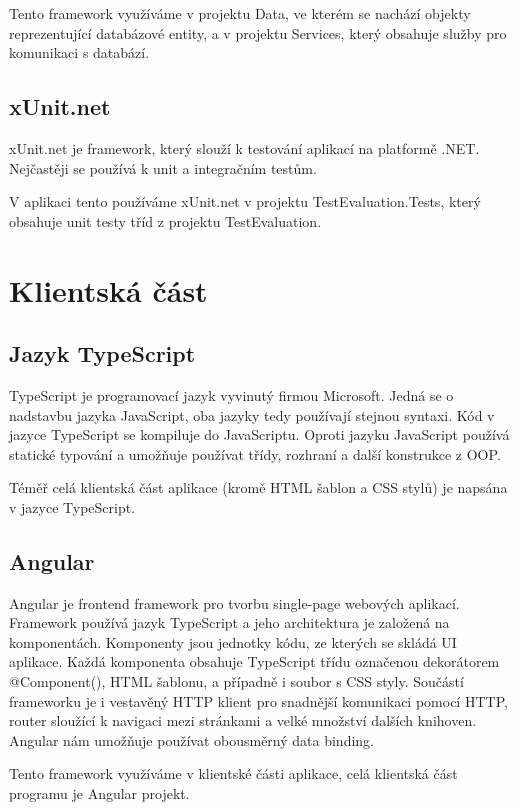 Tento framework využíváme v projektu Data, ve kterém se nachází objekty reprezentující databázové entity, a v projektu Services, který obsahuje služby pro komunikaci s databází.

\subsection{xUnit.net}
xUnit.net je framework, který slouží k testování aplikací na platformě .NET. Nejčastěji se používá k unit a integračním testům. 
\cite{xUnitDocs}

V aplikaci tento používáme xUnit.net v projektu TestEvaluation.Tests, který obsahuje unit testy tříd z projektu TestEvaluation.

\section{Klientská část}

\subsection{Jazyk TypeScript}
TypeScript je programovací jazyk vyvinutý firmou Microsoft. Jedná se o nadstavbu jazyka JavaScript, oba jazyky tedy používají stejnou syntaxi. Kód v jazyce TypeScript se kompiluje do JavaScriptu.
Oproti jazyku JavaScript používá statické typování a umožňuje používat třídy, rozhraní a další konstrukce z OOP. 
\cite{TypescriptDocs}

Téměř celá klientská část aplikace (kromě HTML šablon a CSS stylů) je napsána v jazyce TypeScript.

\subsection{Angular}
Angular je frontend framework pro tvorbu single-page webových aplikací. Framework používá jazyk TypeScript a jeho architektura je založená na komponentách.
Komponenty jsou jednotky kódu, ze kterých se skládá UI aplikace. Každá komponenta obsahuje TypeScript třídu označenou dekorátorem @Component(), HTML šablonu, a případně i soubor s CSS styly. 
Součástí frameworku je i vestavěný HTTP klient pro snadnější komunikaci pomocí HTTP, router sloužící k navigaci mezi stránkami a velké množství dalších knihoven. Angular nám umožňuje používat obousměrný data binding.
\cite{AngularDocs}

Tento framework využíváme v klientské části aplikace, celá klientská část programu je Angular projekt.

